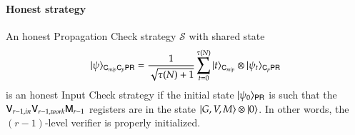\paragraph{Honest strategy}
An honest Propagation Check strategy $\mathcal{S}$ with shared state
\[
	|\psi\rangle_{{\mathsf{C}}_{mip} {\mathsf{C}}_p {\mathsf{P}} {\mathsf{R}}} = \frac{1}{\sqrt{\tau(N) + 1}} \sum_{t = 0}^{\tau(N)} |t\rangle_{{\mathsf{C}}_{mip}} \otimes |\psi_t\rangle_{{\mathsf{C}}_p {\mathsf{P}} {\mathsf{R}}}
\]
is an honest Input Check strategy if the initial state $|\psi_0\rangle_{{\mathsf{P}} {\mathsf{R}}}$ is such that the ${\mathsf{V}}_{r-1,in}{\mathsf{V}}_{r-1,work} {\mathsf{M}}_{r-1}$ registers are in the state $|G,V,M\rangle \otimes |0\rangle$. In other words, the $(r-1)$-level verifier is properly initialized.




